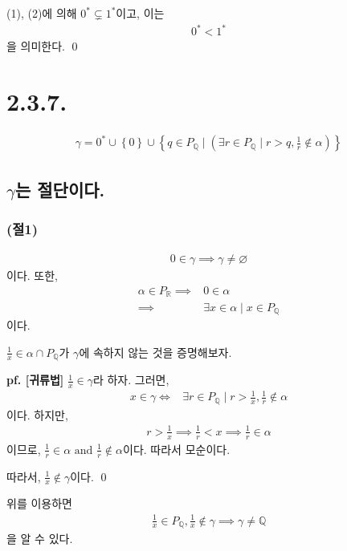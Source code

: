 \documentclass{article}
\begin{document}
(1), (2)에 의해 $0^* \subsetneq 1^*$이고, 이는 
\begin{align*}
0^* < 1^*
\end{align*}을 의미한다. \qed


\section{2.3.7.}
\begin{align*}
\gamma = 0^* \cup \left\{0\right\} \cup \left\{q \in P_{\mathbb{Q}} \mid \left(\exists r \in P_{\mathbb{Q}} \mid r > q, \frac{1}{r} \notin \alpha \right) \right\}
\end{align*}
\subsection{$\gamma$는 절단이다.}
\subsubsection{(절1)}
\begin{align*}
0 \in \gamma \implies \gamma \neq \varnothing \tag{(1)}
\end{align*}이다. 또한,
\begin{align*}
\alpha \in P_{\mathbb{R}} \implies& 0 \in \alpha 
\\ \implies& \exists x \in \alpha \mid x \in P_{\mathbb{Q}}
\end{align*}이다. 

$\frac{1}{x} \in \alpha \cap P_{\mathbb{Q}}$가 $\gamma$에 속하지 않는 것을 증명해보자.

\textbf{pf. [귀류법]} $\frac{1}{x} \in \gamma$라 하자. 그러면,
\begin{align*}
x \in \gamma \iff& \exists r \in P_{\mathbb{Q}} \mid r > \frac{1}{x}, \frac{1}{r} \notin \alpha
\end{align*}이다. 하지만,
\begin{align*}
r > \frac{1}{x} \implies \frac{1}{r} < x \implies \frac{1}{r} \in \alpha
\end{align*}이므로, $\frac{1}{r} \in \alpha \text{ and } \frac{1}{r} \notin \alpha$이다. 따라서 모순이다.

따라서, $\frac{1}{x} \notin \gamma$이다. \qed

위를 이용하면
\begin{align*}
\frac{1}{x} \in P_{\mathbb{Q}}, \frac{1}{x} \notin \gamma \implies \gamma \neq \mathbb{Q} \tag{2}
\end{align*}을 알 수 있다.
\end{document}
